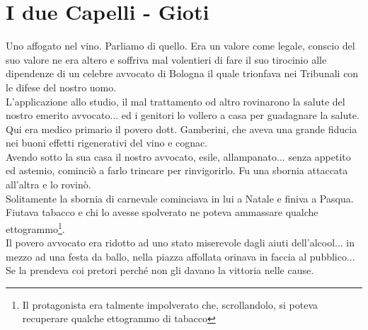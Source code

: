
\chapter{I due Capelli - Gioti}
Uno affogato nel vino. Parliamo di quello. Era un valore come legale, conscio del suo valore ne era altero e soffriva mal volentieri di fare il suo tirocinio alle dipendenze di un celebre avvocato di Bologna il quale trionfava nei Tribunali con le difese del nostro uomo.\\
\indent L'applicazione allo studio, il mal trattamento od altro rovinarono la salute del nostro emerito avvocato... ed i genitori lo vollero a casa per guadagnare la salute.\\
\indent Qui era medico primario il povero dott. Gamberini, che aveva una grande fiducia nei buoni effetti rigenerativi del vino e cognac.\\
\indent Avendo sotto la sua casa il nostro avvocato, esile, allampanato... senza appetito ed astemio, cominciò a farlo trincare per rinvigorirlo. Fu una sbornia attaccata all'altra e lo rovinò.\\
\indent Solitamente la sbornia di carnevale cominciava in lui a Natale e finiva a Pasqua. Fiutava tabacco e chi lo avesse spolverato ne poteva ammassare qualche ettogrammo\footnote{Il protagonista era talmente impolverato che, scrollandolo, si poteva recuperare qualche ettogrammo di tabacco}.\\
\indent Il povero avvocato era ridotto ad uno stato miserevole dagli aiuti dell'alcool... in mezzo ad una festa da ballo, nella piazza affollata orinava in faccia al pubblico...\\
\indent Se la prendeva coi pretori perché non gli davano la vittoria nelle cause.\\

